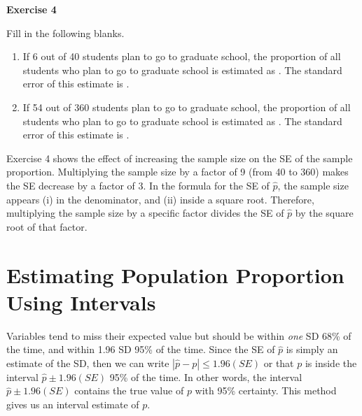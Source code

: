 \documentclass[11pt, chapterprefix=true]{scrbook}\usepackage[]{graphicx}\usepackage[]{color}
\begin{document}
\begin{minipage}[ht]{3cm}

\vspace{-40mm}

\textbf{Exercise 4}
\end{minipage}
\begin{minipage}[ht]{11cm}

\parbox{11cm}{

Fill in the following blanks.

\begin{enumerate}
\item If 6 out of 40 students plan to go to graduate school, the proportion of all students who plan to go to graduate school is estimated as \underline{\phantom{xxxxxxx}}.  The standard error of this estimate is \underline{\phantom{xxxxxxx}}.
\item If 54 out of 360 students plan to go to graduate school, the proportion of all students who plan to go to graduate school is estimated as \underline{\phantom{xxxxxxx}}.  The standard error of this estimate is \underline{\phantom{xxxxxxx}}.
\end{enumerate}

}
\end{minipage}

Exercise 4 shows the effect of increasing the sample size on the SE of the sample proportion.  Multiplying the sample size by a factor of 9 (from 40 to 360) makes the SE decrease by a factor of 3.  In the formula for the SE of $\hat{p}$,  the sample size appears (i) in the denominator, and (ii) inside a square root.  Therefore, multiplying the sample size by a specific factor divides the SE of $\hat{p}$ by the square root of that factor.


\section{Estimating Population Proportion Using Intervals}

Variables tend to miss their expected value but should be within \textit{one} SD 68\% of the time, and within 1.96 SD 95\% of the time.  Since the SE of $\hat{p}$ is simply an estimate of the SD, then we can write $| \hat{p} - p | \le 1.96(SE)$ or that $p$ is inside the interval $\hat{p} \pm 1.96(SE)$ 95\% of the time.  In other words, the interval $\hat{p} \pm 1.96(SE)$ contains the true value of $p$ with 95\% certainty.  This method gives us an interval estimate of $p$.
\end{document}
